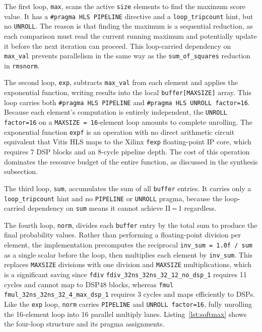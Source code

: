 The first loop, \texttt{max}, scans the active \texttt{size} elements
to find the maximum score value. It has a \texttt{\#pragma HLS
PIPELINE} directive and a \texttt{loop\_tripcount} hint, but no
\texttt{UNROLL}. The reason is that finding the maximum is a
sequential reduction, as each comparison must read the current running
maximum and potentially update it before the next iteration can
proceed. This loop-carried dependency on \texttt{max\_val} prevents
parallelism in the same way as the \texttt{sum\_of\_squares} reduction
in \texttt{rmsnorm}.

The second loop, \texttt{exp}, subtracts \texttt{max\_val} from each
element and applies the exponential function, writing results into the
local \texttt{buffer[MAXSIZE]} array. This loop carries both
\texttt{\#pragma HLS PIPELINE} and \texttt{\#pragma HLS UNROLL
factor=16}. Because each element's computation is entirely
independent, the \texttt{UNROLL factor=16} on a
\texttt{MAXSIZE = 16}-element loop amounts to complete unrolling. The exponential function
\texttt{expf} is an operation with no direct arithmetic circuit equivalent that Vitis HLS maps to
the Xilinx \texttt{fexp} floating-point IP core, which requires 7 DSP
blocks and an 8-cycle pipeline depth. The cost of this operation
dominates the resource budget of the entire function, as discussed in
the synthesis subsection.

The third loop, \texttt{sum}, accumulates the sum of all
\texttt{buffer} entries. It carries only a \texttt{loop\_tripcount}
hint and no \texttt{PIPELINE} or \texttt{UNROLL} pragma, because the
loop-carried dependency on \texttt{sum} means it cannot achieve
II\,=\,1 regardless.

The fourth loop, \texttt{norm}, divides each \texttt{buffer} entry by
the total sum to produce the final probability values. Rather than
performing a floating-point division per element, the implementation
precomputes the reciprocal \texttt{inv\_sum = 1.0f / sum} as a single
scalar before the loop, then multiplies each element by
\texttt{inv\_sum}. This replaces \texttt{MAXSIZE} divisions with one
division and \texttt{MAXSIZE} multiplications, which is a significant
saving since \texttt{fdiv} \texttt{fdiv\_32ns\_32ns\_32\_12\_no\_dsp\_1}
requires 11 cycles and cannot map to
DSP48 blocks, whereas \texttt{fmul} \texttt{fmul\_32ns\_32ns\_32\_4\_max\_dsp\_1}
requires 3 cycles and maps
efficiently to DSPs. Like the \texttt{exp} loop, \texttt{norm} carries
\texttt{PIPELINE} and \texttt{UNROLL factor=16}, fully unrolling the
16-element loop into 16 parallel multiply lanes.
Listing~\ref{lst:softmax} shows the four-loop structure and its pragma
assignments.

